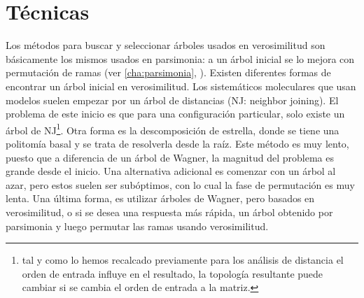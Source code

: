 \section*{T\'ecnicas}
Los m\'etodos para buscar y seleccionar \'arboles usados en verosimilitud son b\'asicamente los mismos usados en parsimonia: a un \'arbol inicial se lo mejora con permutaci\'on de ramas (ver \ref{cha:parsimonia}, \pageref{cha:parsimonia}). Existen diferentes formas de encontrar un \'arbol inicial en verosimilitud. Los sistem\'aticos moleculares que usan modelos suelen empezar por un \'arbol de distancias (NJ: neighbor joining). El problema de este inicio es que para una configuraci\'on particular, solo existe un \'arbol de NJ\footnote{tal y como lo hemos recalcado previamente para los an\'alisis de distancia el orden de entrada influye en el resultado, la topolog\'ia resultante puede cambiar si se cambia el orden de entrada a la matriz.}. Otra forma es la descomposici\'on de estrella, donde se tiene una politom\'ia basal y se trata de resolverla desde la ra\'iz. Este m\'etodo es muy lento, puesto que a diferencia de un \'arbol de Wagner, la magnitud del problema es grande desde el inicio. Una alternativa adicional es comenzar con un \'arbol al azar, pero estos suelen ser sub\'optimos, con lo cual la fase de permutaci\'on es muy lenta. Una \'ultima forma, es utilizar \'arboles de Wagner, pero basados en verosimilitud, o si se desea una respuesta m\'as r\'apida, un \'arbol obtenido por parsimonia y luego permutar las ramas usando verosimilitud.

